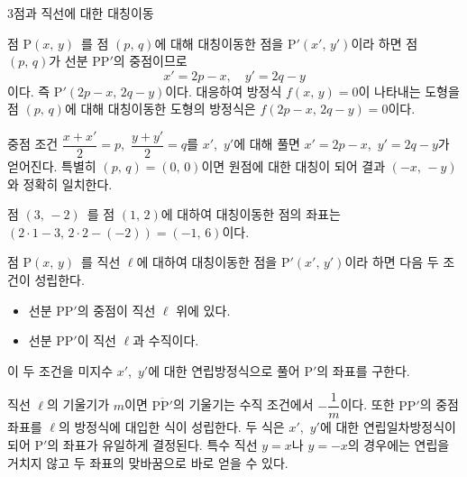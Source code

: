 \documentclass[10pt]{article}
\begin{document}
\begin{dmconcept}{3}{점과 직선에 대한 대칭이동}
\setlength{\parskip}{1.4mm plus 1.5mm minus 0mm}\linespread{1.21}\selectfont%


점 $\mathrm{P}(x,\, y)$\ 를 점 $(p,\, q)$에 대해 대칭이동한 점을 $\mathrm{P}'(x',\, y')$이라 하면 점 $(p,\, q)$가 선분 $\mathrm{P}\mathrm{P}'$의 중점이므로
\begin{equation*}
  x' = 2p - x, \quad y' = 2q - y
\end{equation*}
이다. 즉 $\mathrm{P}'(2p - x,\, 2q - y)$이다. 대응하여 방정식 $f(x,\, y) = 0$이 나타내는 도형을 점 $(p,\, q)$에 대해 대칭이동한 도형의 방정식은 $f(2p - x,\, 2q - y) = 0$이다.

\begin{dmexplain}
중점 조건 $\dfrac{x + x'}{2} = p$,\ $\dfrac{y + y'}{2} = q$를 $x'$,\ $y'$에 대해 풀면 $x' = 2p - x$,\ $y' = 2q - y$가 얻어진다. 특별히 $(p,\, q) = (0,\, 0)$이면 원점에 대한 대칭이 되어 결과 $(-x,\, -y)$와 정확히 일치한다.
\end{dmexplain}

\begin{dmexample}
점 $(3,\, -2)$\ 를 점 $(1,\, 2)$에 대하여 대칭이동한 점의 좌표는 $(2 \cdot 1 - 3,\, 2 \cdot 2 - (-2)) = (-1,\, 6)$이다.
\end{dmexample}


점 $\mathrm{P}(x,\, y)$\ 를 직선 $\ell$에 대하여 대칭이동한 점을 $\mathrm{P}'(x',\, y')$이라 하면 다음 두 조건이 성립한다.
\begin{itemize}[leftmargin=8mm, itemsep=0.5mm, topsep=1mm]
  \item 선분 $\mathrm{P}\mathrm{P}'$의 중점이 직선 $\ell$ 위에 있다.
  \item 선분 $\mathrm{P}\mathrm{P}'$이 직선 $\ell$과 수직이다.
\end{itemize}
이 두 조건을 미지수 $x'$,\ $y'$에 대한 연립방정식으로 풀어 $\mathrm{P}'$의 좌표를 구한다.

\begin{dmexplain}
직선 $\ell$의 기울기가 $m$이면 $\overline{\mathrm{P}\mathrm{P}'}$의 기울기는 수직 조건에서 $-\dfrac{1}{m}$이다. 또한 $\mathrm{P}\mathrm{P}'$의 중점 좌표를 $\ell$의 방정식에 대입한 식이 성립한다. 두 식은 $x'$,\ $y'$에 대한 연립일차방정식이 되어 $\mathrm{P}'$의 좌표가 유일하게 결정된다. 특수 직선 $y = x$나 $y = -x$의 경우에는 연립을 거치지 않고 두 좌표의 맞바꿈으로 바로 얻을 수 있다.
\end{dmexplain}


\end{dmconcept}
\end{document}
